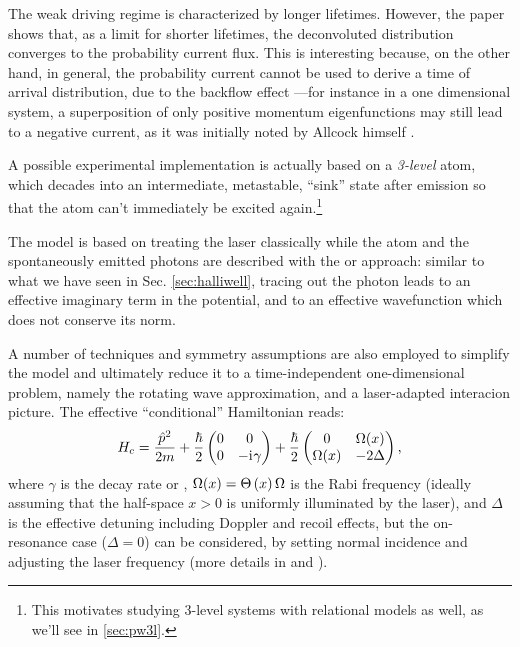 The weak driving regime is characterized by longer lifetimes.
However, the paper shows that,
as a limit for shorter lifetimes,
the deconvoluted distribution converges
to
the probability current flux.
This is interesting because, on the other hand, in general,
the probability current cannot be used to derive a time of arrival
distribution, due to the backflow effect
---for instance in a one dimensional system, a superposition of only positive momentum eigenfunctions may still lead to a
negative current, as it was initially noted by Allcock himself \parencite{Allcock-3}.

A possible experimental implementation is actually based on a \emph{3-level} atom,
which decades into an intermediate, metastable, 
``sink'' state after emission \parencite{Metastable, TQM2} so 
that the atom can't immediately be excited again.\footnote{
  This motivates studying 3-level systems with
  relational models as well, as we'll see in \ref{sec:pw3l}.
}

The model is based on treating the laser classically
while the atom and the spontaneously emitted photons are
described with the  or 
approach: similar to what we have seen in Sec. \ref{sec:halliwell},
tracing out the photon leads to an effective
imaginary term in the potential, and to an effective
wavefunction which does not conserve its norm.

A number of techniques and symmetry assumptions are also employed
to simplify the model and ultimately reduce it
to a time-independent one-dimensional problem, namely
the rotating wave approximation, and
a laser-adapted interacion picture. The effective ``conditional'' Hamiltonian reads:
\begin{equation}\label{eq:eff_atom_laser_detect_H}
  {H}_{c} = \frac{\hat{p}^2}{2m} +
  \frac{\hbar}{2} \left(
    \begin{matrix}
      0 & 0\\
      0 & -\iu\gamma
    \end{matrix}
  \right)
  +
  \frac{\hbar}{2} \left(
    \begin{matrix}%
      0         & \Omega(x)\\
      \Omega(x) & -2\Delta
    \end{matrix}
  \right)
  \text{,}
\end{equation}
where $\gamma$ is the decay rate or ,
$\Omega(x) = \Theta\left(x\right)\Omega$ is the Rabi frequency (ideally assuming that the half-space $x>0$ is uniformly illuminated by the laser),
and $\Delta$ is the effective detuning including Doppler and recoil effects,
but the on-resonance case ($\Delta=0$) can be considered,
by setting normal incidence and adjusting the laser frequency
(more details in \cite{Damborenea} and \cite[\S 4.2]{TQM2}).


